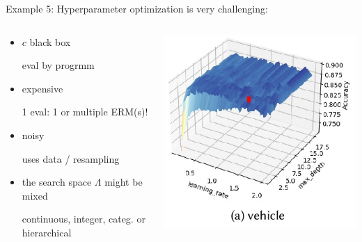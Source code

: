 \documentclass[11pt,compress,t,notes=noshow, xcolor=table]{beamer}
\begin{document}
\begin{vbframe}{Example 5: Hyperparameter optimization}
is very challenging:  
\vspace*{-0.2cm} 
\begin{columns}
	\begin{column}{0.6\textwidth}
	\begin{itemize}
		\item $c$ black box \\
		\begin{footnotesize}eval by progrmm\end{footnotesize}
		\item expensive \\
		\begin{footnotesize}
		1 eval: 1 or multiple ERM(s)!
		\end{footnotesize}
		\item noisy \\
		\begin{footnotesize}
		uses data / resampling
		\end{footnotesize}
  		\item the search space $\Lambda$ might be mixed 
		\begin{footnotesize}
		continuous, integer, categ. or hierarchical
		\end{footnotesize}
	\end{itemize}
	\end{column}
 	\begin{column}{0.35\textwidth}
		\begin{center}
			\includegraphics[width = 1.0\textwidth]{figure_man/landscapes2.jpg}

\end{center}
\end{column}
\end{columns}
\end{vbframe}
\end{document}
